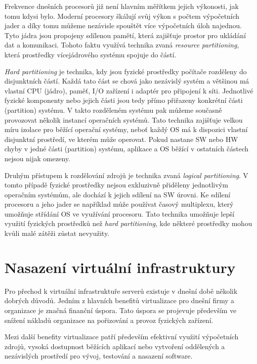     Frekvence dnešních procesorů již není hlavním měřítkem jejich výkonosti, jak tomu kdysi bylo. Moderní procesory škálují svůj výkon s počtem výpočetních jader a díky tomu můžeme nezávisle spouštět více výpočetních úloh
    najednou. Tyto jádra jsou propojeny sdílenou pamětí, která zajišťuje prostor pro ukládání dat a komunikaci. Tohoto faktu využívá technika zvaná \textit{resource partitioning}, která prostředky vícejádrového systému
    spojuje do částí.
    
    \textit{Hard partitioning} je technika, kdy jsou fyzické prostředky počítače rozděleny do disjunktních částí. Každá tato část se chová jako nezávislý systém a většinou má vlastní CPU (jádro), paměť, I/O zařízení i
    adaptér pro připojení k síti. Jednotlivé fyzické komponenty nebo jejich části jsou tedy přímo přiřazeny konkrétní části (partition) systému. V takto rozděleném systému pak můžeme současně provozovat několik instancí operačních systémů.
    Tato technika zajišťuje velkou míru izolace pro běžící operační systémy, neboť každý OS má k dispozici vlastní disjunktní prostředí, ve kterém může operovat. Pokud nastane SW nebo HW chyby v jedné části (partition) systému, aplikace
    a OS běžící v ostatních částech nejsou nijak omezeny.
    
    Druhým přístupem k rozdělování zdrojů je technika zvaná \textit{logical partitioning}. V tomto případě fyzické prostředky nejsou exkluzivně přiděleny jednotlivým operačním systémům, ale dochází k jejich sdílení na
    SW úrovni. Ke sdílení procesoru a jeho jader se například může používat časový multiplexu, který umožňuje střídání OS ve využívání procesoru. Tato technika umožňuje lepší využití fyzických prostředků než \textit{hard partitioning},
    kde některé prostředky mohou kvůli malé zátěži zůstat nevyužity.          

\section{Nasazení virtuální infrastruktury}
\label{section:vm_deployment}

Pro přechod k virtuální infrastruktuře serverů existuje v dnešní době několik dobrých důvodů. Jedním z hlavních benefitů virtualizace pro dnešní firmy a organizace je značná finanční úspora. Tato úspora se
projevuje především ve snížení nákladů organizace na pořizování a provoz fyzických zařízení. 

Mezi další benefity virtualizace patří především efektivní využití výpočetních zdrojů, vysoká dostupnost běžících aplikací nebo vytvoření oddělených a nezávislých prostředí pro vývoj, testování a nasazení software.

